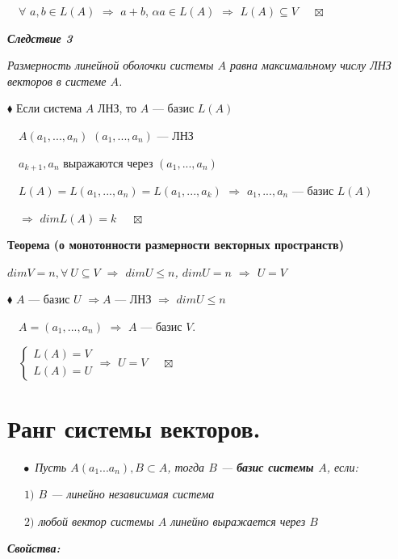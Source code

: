 \documentclass[a4paper, 12pt]{report}
\begin{document}
	$\quad\forall$ $a, b \in L(A)$ $\Rightarrow$ $a + b$, $\alpha a \in L(A)$ $\Rightarrow$ $L(A) \subseteq V$
	$\quad\boxtimes$
	
	\par\bigskip
	\textit{\textbf{Следствие 3}}
	
	\textit{Размерность линейной оболочки системы $A$ равна максимальному числу ЛНЗ векторов в системе $A$.}
	\par\bigskip
	$\blacklozenge$ Если система $A$ ЛНЗ, то $A$ --- базис $L(A)$
	
	$\quad A(a_1, ..., a_n)$ $(a_1, ..., a_n)$ --- ЛНЗ
	
	$\quad a_{k+1}, a_n$ выражаются через $(a_1, ..., a_n)$
	
	$\quad L(A) = L(a_1, ..., a_n) = L(a_1, ..., a_k)$ $\Rightarrow$ $a_1, ..., a_n$ --- базис $L(A)$
	
	$\quad\Rightarrow$ $dim L(A) = k$
	$\quad\boxtimes$
	
	\par\bigskip
	\textbf{Теорема (о монотонности размерности векторных пространств)}
	
	\textit{$dim V = n, \forall\ U \subseteq V$ $\Rightarrow$ $dim U \leqslant n$, $dim U = n$ $\Rightarrow$ $U = V$}
	\par\bigskip
	$\blacklozenge$ $A$ --- базис $U$ $\Rightarrow A$ --- ЛНЗ $\Rightarrow$ $dim U \leqslant n$
	
	$\quad A = (a_1, ..., a_n)$ $\Rightarrow$ $A$ --- базис $V$.
	
	$\quad\begin{cases} L(A) = V \\ L(A) = U \end{cases}\Rightarrow$ $U = V$
	$\quad\boxtimes$
	
	
	
	
	
	
	
	
	
	
	
	
	\section{Ранг системы векторов.}
	$\quad\; \bullet$ \textit{ Пусть $A(a_{1}...a_{n}), B \subset A$, тогда
		$B$ --- \textbf{базис системы $A$}, если:}
	
	$\quad \; \ $\textit{$1)$ $B$ --- линейно независимая система}
	
	$\quad \; \ $\textit{$2)$ любой вектор системы $A$ линейно выражается через $B$}
	\par\bigskip
	\textit{\textbf{Свойства:}}
	
\end{document}
